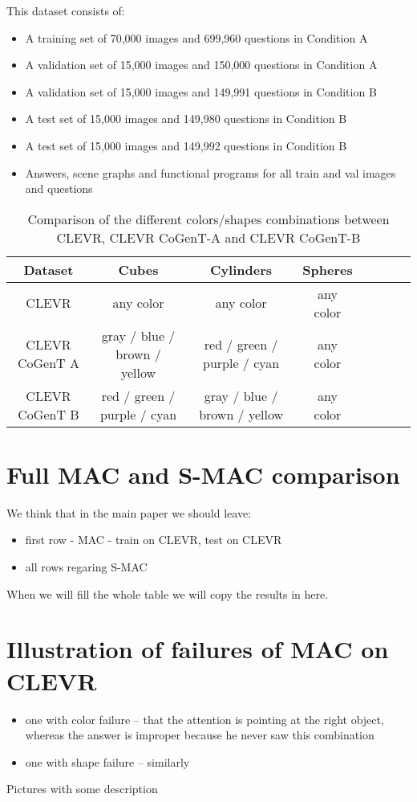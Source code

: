 This dataset consists of:
\begin{itemize}
\item	A training set of 70,000 images and 699,960 questions in Condition A
\item	A validation set of 15,000 images and 150,000 questions in Condition A
\item	A validation set of 15,000 images and 149,991 questions in Condition B
\item	A test set of 15,000 images and 149,980 questions in Condition B
\item	A test set of 15,000 images and 149,992 questions in Condition B
\item	Answers, scene graphs and functional programs for all train and val images and questions
\end{itemize}

\begin{table}
	\centering
	\begin{tabular}{ccccCcCc}
		\toprule
		Dataset        & Cubes              & Cylinders &  Spheres         \\
		\midrule
		CLEVR   &  any color &  any color        &    any color    \\
		CLEVR CoGenT A & gray / blue / brown / yellow  & red / green / purple / cyan       &    any color  \\
		CLEVR CoGenT B  & red / green / purple / cyan &   gray / blue / brown / yellow       &      any color  \\
		\bottomrule
	\end{tabular}
	\caption{Comparison of the different colors/shapes combinations between CLEVR, CLEVR CoGenT-A and CLEVR CoGenT-B  }
	\label{tab:parameters}
\end{table}

\section{Full MAC and S-MAC comparison}

We think that in the main paper we should leave:
\begin{itemize}
\item first row - MAC - train on CLEVR, test on CLEVR 
\item all rows regaring S-MAC
\end{itemize}

When we will fill the whole table we will copy the results in here.

\section{Illustration of failures of MAC on CLEVR}

\begin{itemize}
\item one with color failure -- that the attention is pointing at the right object, whereas the answer is improper because he never saw this combination
\item one with shape failure -- similarly	
\end{itemize}
Pictures with some description